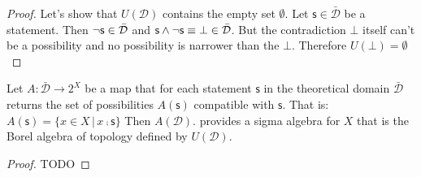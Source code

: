 \documentclass[11pt,letterpaper,fleqn]{memoir} %
\begin{document}
\begin{mathSection}
\begin{proof}
	Let's show that $U(\mathcal{D})$ contains the empty set $\emptyset$. Let $\mathsf{s} \in \bar{\mathcal{D}}$ be a statement. Then $\neg\mathsf{s} \in \bar{\mathcal{D}}$ and $\mathsf{s} \wedge \neg\mathsf{s} \equiv \bot \in \bar{\mathcal{D}}$. But the contradiction $\bot$ itself can't be a possibility and no possibility is narrower than the $\bot$. Therefore $U(\bot) = \emptyset$
\end{proof}

\begin{prop}
	Let $A : \bar{\mathcal{D}} \rightarrow 2^X$ be a map that for each statement $\mathsf{s}$ in the theoretical domain $\bar{\mathcal{D}}$ returns the set of possibilities $A(\mathsf{s})$ compatible with $\mathsf{s}$. That is: $A(\mathsf{s})=\{ x \in X \, | \, x \comp \mathsf{s}\}$ Then $A(\mathcal{D})$. provides a sigma algebra for $X$ that is the Borel algebra of topology defined by $U(\mathcal{D})$.
\end{prop}

\begin{proof}
	TODO
\end{proof}

\end{mathSection}
\end{document}
